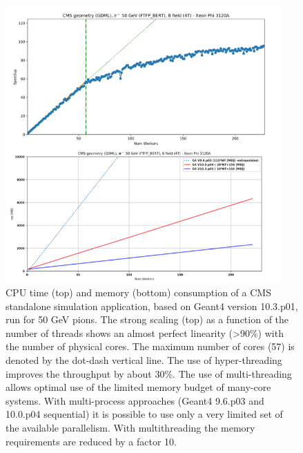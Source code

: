 \documentclass[12pt,a4paper]{article}
\begin{document}
{\begin{figure}[bthp]
\vspace*{0.3cm}
\centering
\includegraphics[width=0.94\textwidth]{image9.png}
\caption{CPU time (top) and memory (bottom) consumption of a CMS standalone
simulation application, based on Geant4 version 10.3.p01, run for 50 GeV
pions. The strong scaling (top) as a function of the number of threads
shows an almost perfect linearity (\textgreater{}90\%) with the number
of physical cores. The maximum number of cores (57) is denoted by the
dot-dash vertical line. The use of hyper-threading improves the
throughput by about 30\%. The use of multi-threading allows optimal use
of the limited memory budget of many-core systems. With multi-process
approaches (Geant4 9.6.p03 and 10.0.p04 sequential) it is possible to
use only a very limited set of the available parallelism. With
multithreading the memory requirements are reduced by a factor 10.}
\label{fig:perfcms}
\end{figure}

}
\end{document}

